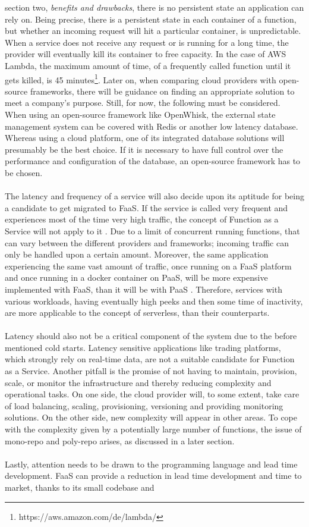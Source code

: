 \documentclass[a4paper,twoside,11pt, pagesize]{scrartcl}
\begin{document}
\begin{spacing}{1.2}
section two, \textit{benefits and drawbacks}, there is no persistent state an application can rely on. Being precise, there is a persistent state in each container of a function, but whether an incoming request will hit a particular container, is unpredictable. When a service does not receive any request or is running for a long time, the provider will eventually kill its container to free capacity. In the case of AWS Lambda, the maximum amount of time, of a frequently called function until it gets killed, is 45 minutes\footnote{https://aws.amazon.com/de/lambda/}. Later on, when comparing cloud providers with open-source frameworks, there will be guidance on finding an appropriate solution to meet a company's purpose. Still, for now, the following must be considered. When using an open-source framework like OpenWhisk, the external state management system can be covered with Redis or another low latency database. Whereas using a cloud platform, one of its integrated database solutions will presumably be the best choice. If it is necessary to have full control over the performance and configuration of the database, an open-source framework has to be chosen.\\\\ The latency and frequency of a service will also decide upon its aptitude for being a candidate to get migrated to FaaS. If the service is called very frequent and experiences most of the time very high traffic, the concept of Function as a Service will not apply to it \cite{jonas2019cloud}. Due to a limit of concurrent running functions, that can vary between the different providers and frameworks; incoming traffic can only be handled upon a certain amount. Moreover, the same application experiencing the same vast amount of traffic, once running on a FaaS platform and once running in a docker container on PaaS, will be more expensive implemented with FaaS, than it will be with PaaS \cite{jonas2019cloud}. Therefore, services with various workloads, having eventually high peeks and then some time of inactivity, are more applicable to the concept of serverless, than their counterparts.\\\\ Latency should also not be a critical component of the system due to the before mentioned cold starts. Latency sensitive applications like trading platforms, which strongly rely on real-time data, are not a suitable candidate for Function as a Service. Another pitfall is the promise of not having to maintain, provision, scale, or monitor the infrastructure and thereby reducing complexity and operational tasks. On one side, the cloud provider will, to some extent, take care of load balancing, scaling, provisioning, versioning and providing monitoring solutions. On the other side, new complexity will appear in other areas. To cope with the complexity given by a potentially large number of functions, the issue of mono-repo and poly-repo arises, as discussed in a later section.\\\\ Lastly, attention needs to be drawn to the programming language and lead time development. FaaS can provide a reduction in lead time development and time to market, thanks to its small codebase and 
\end{spacing}
\end{document}
